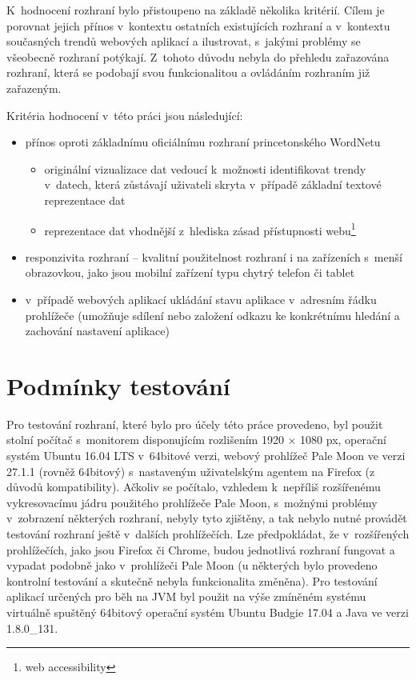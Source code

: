 \documentclass[a4paper,11pt,openany,twoside]{book}
\begin{document}
				K~hodnocení rozhraní bylo přistoupeno na základě několika kritérií. Cílem je porovnat jejich přínos v~kontextu ostatních existujících rozhraní a v~kontextu současných trendů webových aplikací a ilustrovat, s~jakými problémy se všeobecně rozhraní potýkají.  Z~tohoto důvodu nebyla do přehledu zařazována rozhraní, která se podobají svou funkcionalitou a ovládáním rozhraním již zařazeným. 

				Kritéria hodnocení v~této práci jsou následující:

					\begin{itemize}
						\item přínos oproti základnímu oficiálnímu rozhraní princetonského WordNetu
							\begin{itemize}
								\item originální vizualizace dat vedoucí k~možnosti identifikovat trendy v~datech, která zůstávají uživateli skryta v~případě základní textové reprezentace dat
								\item reprezentace dat vhodnější z~hlediska zásad přístupnosti webu\footnote{web accessibility}
							\end{itemize}
						\item responzivita rozhraní -- kvalitní použitelnost rozhraní i na zařízeních s~menší obrazovkou, jako jsou mobilní zařízení typu chytrý telefon či tablet
						\item v~případě webových aplikací ukládání stavu aplikace v~adresním řádku prohlížeče (umožňuje sdílení nebo založení odkazu ke konkrétnímu hledání a zachování nastavení aplikace)
					\end{itemize}


			\section{Podmínky testování}

				Pro testování rozhraní, které bylo pro účely této práce provedeno, byl použit stolní počítač s~monitorem disponujícím rozlišením 1920 × 1080 px, operační systém Ubuntu 16.04 LTS v~64bitové verzi, webový prohlížeč Pale Moon ve verzi 27.1.1 (rovněž 64bitový) s~nastaveným uživatelským agentem na Firefox (z důvodů kompatibility). Ačkoliv se počítalo, vzhledem k~nepříliš rozšířenému vykresovacímu jádru použitého prohlížeče Pale Moon, s~možnými problémy v~zobrazení některých rozhraní, nebyly tyto zjištěny, a tak nebylo nutné provádět testování rozhraní ještě v~dalších prohlížečích. Lze předpokládat, že v~rozšířených prohlížečích, jako jsou Firefox či Chrome, budou jednotlivá rozhraní fungovat a vypadat podobně jako v~prohlížeči Pale Moon (u některých bylo provedeno kontrolní testování a skutečně nebyla funkcionalita změněna). Pro testování aplikací určených pro běh na JVM byl použit na výše zmíněném systému virtuálně spuštěný 64bitový operační systém Ubuntu Budgie 17.04 a Java ve verzi 1.8.0\_131.
\end{document}

